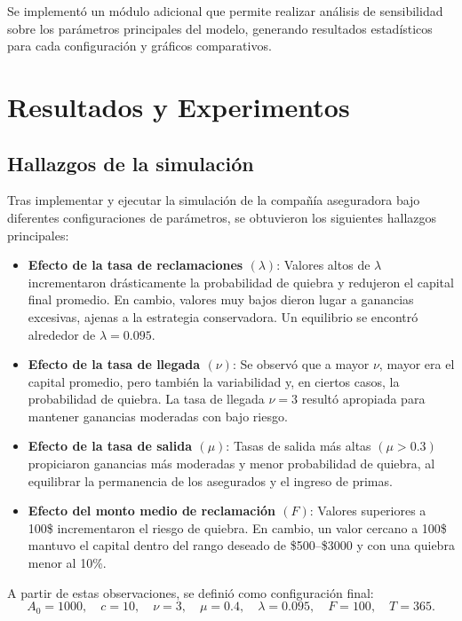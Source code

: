 \documentclass[12pt]{article}
\begin{document}
Se implementó un módulo adicional que permite realizar análisis de sensibilidad sobre los parámetros principales del modelo, generando resultados estadísticos para cada configuración y gráficos comparativos.

\section{Resultados y Experimentos}

\subsection{Hallazgos de la simulación}

Tras implementar y ejecutar la simulación de la compañía aseguradora bajo diferentes configuraciones de parámetros, se obtuvieron los siguientes hallazgos principales:

\begin{itemize}
    \item \textbf{Efecto de la tasa de reclamaciones $(\lambda)$}: Valores altos de $\lambda$ incrementaron drásticamente la probabilidad de quiebra y redujeron el capital final promedio. En cambio, valores muy bajos dieron lugar a ganancias excesivas, ajenas a la estrategia conservadora. Un equilibrio se encontró alrededor de $\lambda = 0.095$.
    \item \textbf{Efecto de la tasa de llegada $(\nu)$}: Se observó que a mayor $\nu$, mayor era el capital promedio, pero también la variabilidad y, en ciertos casos, la probabilidad de quiebra. La tasa de llegada $\nu = 3$ resultó apropiada para mantener ganancias moderadas con bajo riesgo.
    \item \textbf{Efecto de la tasa de salida $(\mu)$}: Tasas de salida más altas $(\mu > 0.3)$ propiciaron ganancias más moderadas y menor probabilidad de quiebra, al equilibrar la permanencia de los asegurados y el ingreso de primas.
    \item \textbf{Efecto del monto medio de reclamación $(F)$}: Valores superiores a 100\$ incrementaron el riesgo de quiebra. En cambio, un valor cercano a 100\$ mantuvo el capital dentro del rango deseado de \$500--\$3000 y con una quiebra menor al 10\%.
\end{itemize}

A partir de estas observaciones, se definió como configuración final:
\[
A_0 = 1000,\quad c = 10,\quad \nu = 3,\quad \mu = 0.4,\quad 
\lambda = 0.095,\quad F = 100,\quad T = 365.
\]
\end{document}
